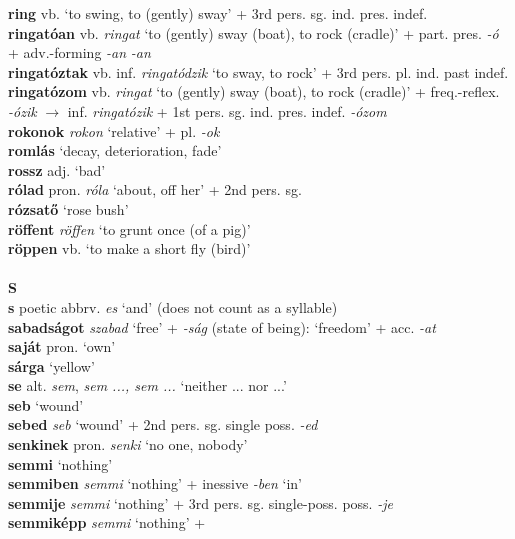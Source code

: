 \documentclass[11pt]{article}
\begin{document}
\textbf{ring} vb. `to swing, to (gently) sway' + 3rd
pers. sg. ind. pres. indef. \\
\textbf{ringatóan} vb. \emph{ringat} `to (gently) sway
(boat), to rock (cradle)' + part. pres. \emph{-ó} +
adv.\hyp{}forming \emph{-an} \emph{-an} \\
\textbf{ringatóztak} vb. inf. \emph{ringatódzik} `to sway, to rock' +
3rd pers. pl. ind. past indef. \\
\textbf{ringatózom} vb. \emph{ringat} `to (gently) sway
(boat), to rock (cradle)' + freq.\hyp{}reflex. \emph{-ózik}
$\rightarrow$ inf. \emph{ringatózik} +
1st pers. sg. ind. pres. indef. \emph{-ózom} \\
\textbf{rokonok} \emph{rokon} `relative' + pl. \emph{-ok} \\
\textbf{romlás} `decay, deterioration, fade' \\
\textbf{rossz} adj. `bad' \\
\textbf{rólad} pron. \emph{róla} `about, off her' + 2nd pers. sg. \\
\textbf{rózsatő} `rose bush' \\
\textbf{röffent} \emph{röffen} `to grunt once (of a pig)' \\
\textbf{röppen} vb. `to make a short fly (bird)' \\
\ \\
\noindent \textbf{\large S} \\
\textbf{s} poetic abbrv. \emph{es} `and' (does not count as a
syllable) \\
\textbf{sabadságot} \emph{szabad} `free' + \emph{-ság} (state of
being): `freedom' + acc. \emph{-at} \\
\textbf{saját} pron. `own' \\
\textbf{sárga} `yellow' \\
\textbf{se} alt. \emph{sem}, \emph{sem ..., sem ...}  `neither
  ... nor ...' \\
\textbf{seb} `wound' \\
\textbf{sebed} \emph{seb} `wound' + 2nd pers. sg. single
poss. \emph{-ed} \\
\textbf{senkinek} pron. \emph{senki} `no one, nobody' \\
\textbf{semmi} `nothing' \\
\textbf{semmiben} \emph{semmi} `nothing' + inessive \emph{-ben} `in' \\
\textbf{semmije} \emph{semmi} `nothing' + 3rd
pers. sg. single\hyp{}poss. poss. \emph{-je} \\
\textbf{semmiképp} \emph{semmi} `nothing' +
\end{document}

